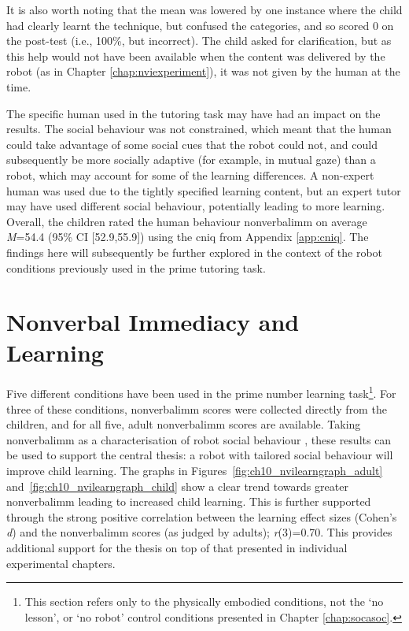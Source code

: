 It is also worth noting that the mean was lowered by one instance where the child had clearly learnt the technique, but confused the categories, and so scored 0 on the post-test (i.e., 100\%, but incorrect). The child asked for clarification, but as this help would not have been available when the content was delivered by the robot (as in Chapter \ref{chap:nviexperiment}), it was not given by the human at the time.

The specific human used in the tutoring task may have had an impact on the results. The social behaviour was not constrained, which meant that the human could take advantage of some social cues that the robot could not, and could subsequently be more socially adaptive (for example, in mutual gaze) than a robot, which may account for some of the \gls{learning} differences. A non-expert human was used due to the tightly specified learning content, but an expert tutor may have used different social behaviour, potentially leading to more \gls{learning}. Overall, the children rated the human behaviour \gls{nonverbalimm} on average \textit{M}=54.4 (95\% CI [52.9,55.9]) using the \acrshort{cniq} from Appendix \ref{app:cniq}. The findings here will subsequently be further explored in the context of the robot conditions previously used in the prime tutoring task.

\section{Nonverbal Immediacy and Learning}\label{sec:chap9-nonvlearn}
Five different conditions have been used in the prime number learning task\footnote{This section refers only to the physically embodied conditions, not the `no lesson', or `no robot' control conditions presented in Chapter \ref{chap:socasoc}.}. For three of these conditions, \gls{nonverbalimm} scores were collected directly from the children, and for all five, adult \gls{nonverbalimm} scores are available. Taking \gls{nonverbalimm} as a characterisation of robot social behaviour \citep{kennedy2015less}, these results can be used to support the central thesis: a robot with tailored social behaviour will improve child \gls{learning}. The graphs in Figures~\ref{fig:ch10_nvilearngraph_adult} and~\ref{fig:ch10_nvilearngraph_child} show a clear trend towards greater \gls{nonverbalimm} leading to increased child \gls{learning}. This is further supported through the strong positive correlation between the \gls{learning} effect sizes (Cohen's \textit{d}) and the \gls{nonverbalimm} scores (as judged by adults); \textit{r}(3)=0.70. This provides additional support for the thesis on top of that presented in individual experimental chapters.

